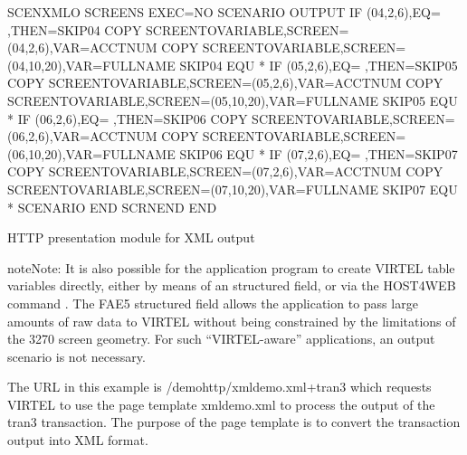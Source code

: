 \documentclass[letterpaper,10pt,english]{sphinxmanual}
\begin{document}
\begin{sphinxVerbatim}[commandchars=\\\{\}]
SCENXMLO    SCREENS EXEC=NO
SCENARIO    OUTPUT
            IF\PYGZdl{} (04,2,6),EQ=\PYGZsq{} \PYGZsq{},THEN=SKIP04
            COPY\PYGZdl{} SCREEN\PYGZhy{}TO\PYGZhy{}VARIABLE,SCREEN=(04,2,6),VAR=\PYGZsq{}ACCTNUM\PYGZsq{}
            COPY\PYGZdl{} SCREEN\PYGZhy{}TO\PYGZhy{}VARIABLE,SCREEN=(04,10,20),VAR=\PYGZsq{}FULLNAME\PYGZsq{}
SKIP04      EQU *
            IF\PYGZdl{} (05,2,6),EQ=\PYGZsq{} \PYGZsq{},THEN=SKIP05
            COPY\PYGZdl{} SCREEN\PYGZhy{}TO\PYGZhy{}VARIABLE,SCREEN=(05,2,6),VAR=\PYGZsq{}ACCTNUM\PYGZsq{}
            COPY\PYGZdl{} SCREEN\PYGZhy{}TO\PYGZhy{}VARIABLE,SCREEN=(05,10,20),VAR=\PYGZsq{}FULLNAME\PYGZsq{}
SKIP05      EQU *
            IF\PYGZdl{} (06,2,6),EQ=\PYGZsq{} \PYGZsq{},THEN=SKIP06
            COPY\PYGZdl{} SCREEN\PYGZhy{}TO\PYGZhy{}VARIABLE,SCREEN=(06,2,6),VAR=\PYGZsq{}ACCTNUM\PYGZsq{}
            COPY\PYGZdl{} SCREEN\PYGZhy{}TO\PYGZhy{}VARIABLE,SCREEN=(06,10,20),VAR=\PYGZsq{}FULLNAME\PYGZsq{}
SKIP06      EQU *
            IF\PYGZdl{} (07,2,6),EQ=\PYGZsq{} \PYGZsq{},THEN=SKIP07
            COPY\PYGZdl{} SCREEN\PYGZhy{}TO\PYGZhy{}VARIABLE,SCREEN=(07,2,6),VAR=\PYGZsq{}ACCTNUM\PYGZsq{}
            COPY\PYGZdl{} SCREEN\PYGZhy{}TO\PYGZhy{}VARIABLE,SCREEN=(07,10,20),VAR=\PYGZsq{}FULLNAME\PYGZsq{}
SKIP07      EQU *
            SCENARIO END
            SCRNEND
            END
\end{sphinxVerbatim}

HTTP presentation module for XML output

\begin{sphinxadmonition}{note}{Note:}
It is also possible for the application program to create VIRTEL table variables directly, either by means of an {\hyperref[\detokenize{User_Guide:v457ug-fae5}]{}} structured field, or via the HOST4WEB command {\hyperref[\detokenize{User_Guide:v457ug-set-variable}]{}}. The FAE5 structured field allows the application to pass large amounts of raw data to VIRTEL without being constrained by the limitations of the 3270 screen geometry. For such “VIRTEL-aware” applications, an output scenario is not necessary.
\end{sphinxadmonition}


The URL in this example is /demohttp/xmldemo.xml+tran3 which requests VIRTEL to use the page template
xmldemo.xml to process the output of the tran3 transaction. The purpose of the page template is to convert the
transaction output into XML format.
\end{document}
